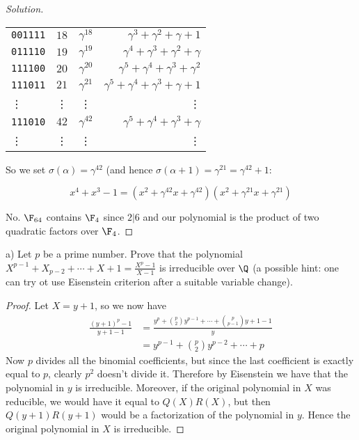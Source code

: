 \begin{proof}[Solution]
\begin{tabular}{l|c|c|r}
\texttt{001111} & $18$ & $\gamma^{18}$ & $\gamma^3 + \gamma^2 + \gamma + 1$\\
\texttt{011110} & $19$ & $\gamma^{19}$ & $\gamma^4 + \gamma^3 + \gamma^2 + \gamma$\\
%
\texttt{111100} & $20$ & $\gamma^{20}$ & $\gamma^5 + \gamma^4 + \gamma^3 + \gamma^2$\\
\texttt{111011} & $21$ & $\gamma^{21}$ & $\gamma^5 + \gamma^4 + \gamma^3 + \gamma + 1$\\
\vdots          & \vdots & \vdots     & \vdots \\
\texttt{111010} & $42$ & $\gamma^{42}$ & $\gamma^5 + \gamma^4 + \gamma^3 + \gamma$\\
\vdots          & \vdots & \vdots     & \vdots
\end{tabular}


So we set $\sigma(\alpha) = \gamma^{42}$ (and hence $\sigma(\alpha + 1) = \gamma^{21} = \gamma^{42} + 1$:

\[
x^4 + x^3 - 1 = (x^2 + \gamma^{42} x + \gamma^{42})(x^2 + \gamma^{21} x + \gamma^{21})
\]

{\color{blue}No. $\F_{64}$ contains $\F_4$ since $2 | 6$ and our polynomial is the product of two quadratic factors over $\F_4$.}
\end{proof}

\begin{que}
a) Let $p$ be a prime number. Prove that the polynomial $X^{p-1} + X_{p-2} + \dotsb + X + 1 = \frac{X^p - 1}{X - 1}$ is irreducible over $\Q$ (a possible hint: one can try ot use Eisenstein criterion after a suitable variable change).
\begin{proof}
Let $X = y + 1$, so we now have 
\begin{align*}
\frac{(y + 1)^p - 1}{y + 1 - 1} &= \frac{y^p + \binom{p}{2} y^{p-1} + \dotsb + \binom{p}{p - 1} y + 1 - 1}{y}\\
                                &= y^{p-1} + \binom{p}{2} y^{p-2} + \dotsb + p
\end{align*}
Now $p$ divides all the binomial coefficients, but since the last coefficient is exactly equal to $p$, clearly $p^2$ doesn't divide it. Therefore by Eisenstein we have that the polynomial in $y$ is irreducible. Moreover, if the original polynomial in $X$ was reducible, we would have it equal to $Q(X)R(X)$, but then $Q(y + 1)R(y + 1)$ would be a factorization of the polynomial in $y$. Hence the original polynomial in $X$ is irreducible.
\end{proof}
\end{que}

